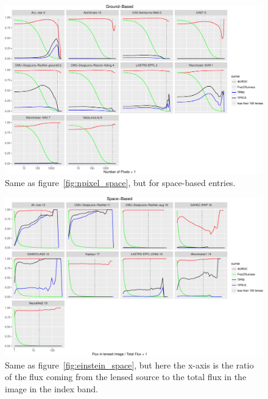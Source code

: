 \documentclass{aa}
\begin{document}
\begin{figure}
 \includegraphics[width=2\columnwidth]{figures/npixel_ground.pdf}
 \caption{Same as figure~\ref{fig:npixel_space}, but for space-based entries.}
 \label{fig:npixel_ground}
\end{figure}

\begin{figure}
 \includegraphics[width=2\columnwidth]{figures/flux_contrast_space.pdf}
  \caption{Same as figure~\ref{fig:einstein_space}, but here the x-axis is the ratio of the flux coming from the lensed source to the total flux in the image in the index band.}
 \label{fig:flux_contrast_space}
\end{figure}
\end{document}
